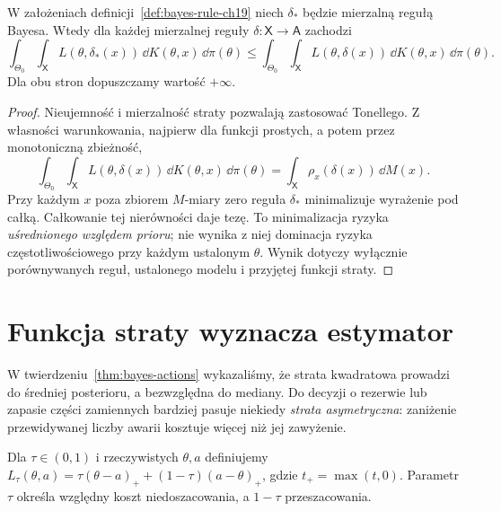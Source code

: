 \begin{twierdzenie}
\label{thm:bayes-risk-tower}
W założeniach definicji~\ref{def:bayes-rule-ch19} niech
$\delta_*$ będzie mierzalną regułą Bayesa. Wtedy dla każdej
mierzalnej reguły $\delta:\mathsf X\to\mathsf A$ zachodzi
\[
\int_{\Theta_0}\int_{\mathsf X}
 L(\theta,\delta_*(x))\,\dd K(\theta,x)\,\dd\pi(\theta)
\le
\int_{\Theta_0}\int_{\mathsf X}
 L(\theta,\delta(x))\,\dd K(\theta,x)\,\dd\pi(\theta).
\]
Dla obu stron dopuszczamy wartość $+\infty$.
\end{twierdzenie}
\begin{proof}
Nieujemność i mierzalność straty pozwalają zastosować Tonellego.
Z własności warunkowania, najpierw dla funkcji prostych, a potem
przez monotoniczną zbieżność,
\[
\int_{\Theta_0}\int_{\mathsf X}L(\theta,\delta(x))
\,\dd K(\theta,x)\,\dd\pi(\theta)
=\int_{\mathsf X}\rho_x(\delta(x))\,\dd M(x).
\]
Przy każdym $x$ poza zbiorem $M$-miary zero reguła $\delta_*$
minimalizuje wyrażenie pod całką. Całkowanie tej nierówności
daje tezę. To minimalizacja ryzyka \emph{uśrednionego względem
prioru}; nie wynika z niej dominacja ryzyka częstotliwościowego
przy każdym ustalonym $\theta$. Wynik dotyczy wyłącznie
porównywanych reguł, ustalonego modelu i przyjętej funkcji straty.
\end{proof}

\section{Funkcja straty wyznacza estymator}
W twierdzeniu~\ref{thm:bayes-actions} wykazaliśmy, że strata
kwadratowa prowadzi do średniej posterioru, a bezwzględna do
mediany. Do decyzji o rezerwie lub zapasie części zamiennych
bardziej pasuje niekiedy \emph{strata asymetryczna}: zaniżenie
przewidywanej liczby awarii kosztuje więcej niż jej zawyżenie.

\begin{definicja}
Dla $\tau\in(0,1)$ i rzeczywistych $\theta,a$ definiujemy
$L_\tau(\theta,a)=\tau(\theta-a)_++(1-\tau)(a-\theta)_+$,
gdzie $t_+=\max(t,0)$. Parametr $\tau$ określa względny
koszt niedoszacowania, a $1-\tau$ przeszacowania.
\end{definicja}

